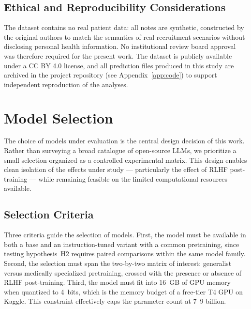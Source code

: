 \subsection{Ethical and Reproducibility Considerations}
\label{subsec:met-data-ethics}

The dataset contains no real patient data: all notes are synthetic, 
constructed by the original authors to match the semantics of real 
recruitment scenarios without disclosing personal health information. No 
institutional review board approval was therefore required for the present 
work. The dataset is publicly available under a CC BY 4.0 license, and all 
prediction files produced in this study are archived in the project 
repository (see Appendix~\ref{app:code}) to support independent 
reproduction of the analyses.

\section{Model Selection}
\label{sec:met-models}

The choice of models under evaluation is the central design decision of this 
work. Rather than surveying a broad catalogue of open-source LLMs, we 
prioritize a small selection organized as a controlled experimental matrix. 
This design enables clean isolation of the effects under study --- 
particularly the effect of RLHF post-training --- while remaining feasible on 
the limited computational resources available.

\subsection{Selection Criteria}
\label{subsec:met-criteria}

Three criteria guide the selection of models. First, the model must be 
available in both a base and an instruction-tuned variant with a common 
pretraining, since testing hypothesis~H2 requires paired comparisons within 
the same model family. Second, the selection must span the two-by-two matrix 
of interest: generalist versus medically specialized pretraining, crossed 
with the presence or absence of RLHF post-training. Third, the model must 
fit into 16~GB of GPU memory when quantized to 4~bits, which is the memory 
budget of a free-tier T4 GPU on Kaggle. This constraint effectively caps the 
parameter count at 7--9 billion.

